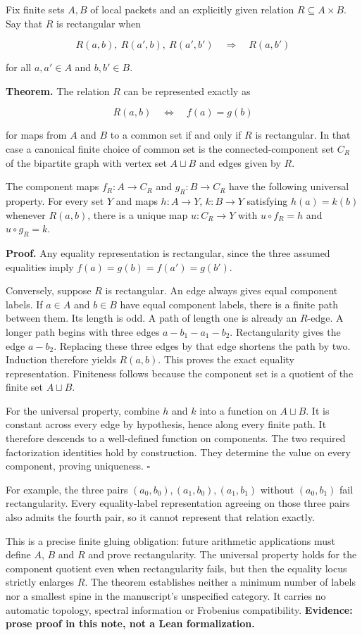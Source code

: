 Fix finite sets \(A,B\) of local packets and an explicitly given
relation \(R\subseteq A\times B\). Say that \(R\) is rectangular when

\[R(a,b),\ R(a',b),\ R(a',b')\quad\Longrightarrow\quad R(a,b')\]

for all \(a,a'\in A\) and \(b,b'\in B\).

\textbf{Theorem.} The relation \(R\) can be represented exactly as

\[R(a,b)\quad\Longleftrightarrow\quad f(a)=g(b)\]

for maps from \(A\) and \(B\) to a common set if and only if \(R\) is
rectangular. In that case a canonical finite choice of common set is the
connected-component set \(C_R\) of the bipartite graph with vertex set
\(A\sqcup B\) and edges given by \(R\).

The component maps \(f_R:A\to C_R\) and \(g_R:B\to C_R\) have the
following universal property. For every set \(Y\) and maps \(h:A\to Y\),
\(k:B\to Y\) satisfying \(h(a)=k(b)\) whenever \(R(a,b)\), there is a
unique map \(u:C_R\to Y\) with \(u\circ f_R=h\) and \(u\circ g_R=k\).

\textbf{Proof.} Any equality representation is rectangular, since the
three assumed equalities imply \(f(a)=g(b)=f(a')=g(b')\).

Conversely, suppose \(R\) is rectangular. An edge always gives equal
component labels. If \(a\in A\) and \(b\in B\) have equal component
labels, there is a finite path between them. Its length is odd. A path
of length one is already an \(R\)-edge. A longer path begins with three
edges \(a-b_1-a_1-b_2\). Rectangularity gives the edge \(a-b_2\).
Replacing these three edges by that edge shortens the path by two.
Induction therefore yields \(R(a,b)\). This proves the exact equality
representation. Finiteness follows because the component set is a
quotient of the finite set \(A\sqcup B\).

For the universal property, combine \(h\) and \(k\) into a function on
\(A\sqcup B\). It is constant across every edge by hypothesis, hence
along every finite path. It therefore descends to a well-defined
function on components. The two required factorization identities hold
by construction. They determine the value on every component, proving
uniqueness. \(\square\)

For example, the three pairs \((a_0,b_0),(a_1,b_0),(a_1,b_1)\) without
\((a_0,b_1)\) fail rectangularity. Every equality-label representation
agreeing on those three pairs also admits the fourth pair, so it cannot
represent that relation exactly.

This is a precise finite gluing obligation: future arithmetic
applications must define \(A\), \(B\) and \(R\) and prove
rectangularity. The universal property holds for the component quotient
even when rectangularity fails, but then the equality locus strictly
enlarges \(R\). The theorem establishes neither a minimum number of
labels nor a smallest spine in the manuscript's unspecified category. It
carries no automatic topology, spectral information or Frobenius
compatibility. \textbf{Evidence: prose proof in this note, not a Lean
formalization.}

